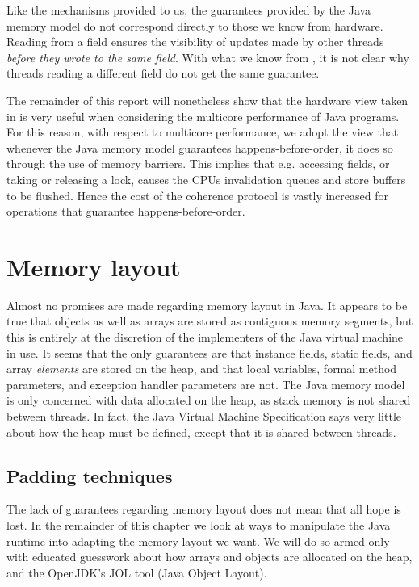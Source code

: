 Like the mechanisms provided to us, the guarantees provided by the Java memory
model do not correspond directly to those we know from hardware. Reading
from a  field ensures the visibility of updates made by other
threads \textit{before they wrote to the same field}. With what we know from
\cite{mckenny-barriers}, it is not clear why threads reading a different
 field do not get the same guarantee.

The remainder of this report will nonetheless show that the hardware view taken
in \cite{mckenny-barriers} is very useful when considering the multicore
performance of Java programs. For this reason, with respect to multicore performance, we adopt
the view that whenever the Java memory model guarantees happens-before-order, it
does so through the use of memory barriers. This implies that e.g. accessing
 fields, or taking or releasing a lock, causes the CPUs
invalidation queues and store buffers to be flushed. Hence the cost of the
coherence protocol is vastly increased for operations that guarantee
happens-before-order.

\section{Memory layout} Almost no promises are made regarding memory layout in
Java. It appears to be true that objects as well as arrays are stored as
contiguous memory segments,
but this is entirely at the discretion of the implementers of the Java virtual
machine in use. It seems that the only guarantees are that instance
fields, static fields, and array \textit{elements} are stored on the heap, and
that local variables, formal method parameters, and exception handler parameters
are not\cite[chapter~17]{javaspec}\cite[chapter~2]{jvmspec}. The Java memory
model is only concerned with data allocated on the heap, as stack memory is not
shared between threads. In fact, the Java Virtual Machine
Specification\cite{jvmspec} says very little about how the heap must be defined,
except that it is shared between threads.

\subsection{Padding techniques}
The lack of guarantees regarding memory layout does not mean that all hope is
lost. In the remainder of this chapter we look at ways to manipulate the Java
runtime into adapting the memory layout we want. We will do so armed only with
educated guesswork about how arrays and objects are allocated on the heap, and
the OpenJDK's JOL tool (Java Object Layout).


